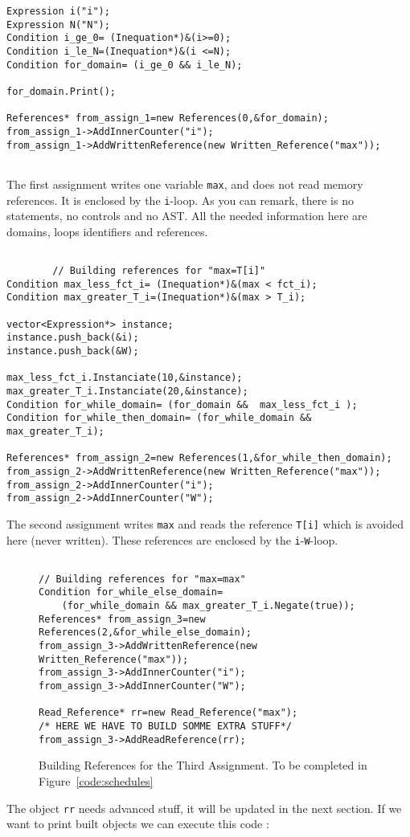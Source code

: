 \begin{lstlisting}[frame=single,framerule=0pt]
Expression i("i");
Expression N("N");
Condition i_ge_0= (Inequation*)&(i>=0);
Condition i_le_N=(Inequation*)&(i <=N);
Condition for_domain= (i_ge_0 && i_le_N);

for_domain.Print();

References* from_assign_1=new References(0,&for_domain);
from_assign_1->AddInnerCounter("i");
from_assign_1->AddWrittenReference(new Written_Reference("max"));


\end{lstlisting}
The first assignment writes one variable \verb|max|, and does not read memory references. It is enclosed by the \verb|i|-loop.
As you can remark, there is no statements, no controls and no AST. All the needed information here  are domains, loops identifiers and references.
\begin{lstlisting}[frame=single,framerule=0pt]

        // Building references for "max=T[i]"
Condition max_less_fct_i= (Inequation*)&(max < fct_i);
Condition max_greater_T_i=(Inequation*)&(max > T_i);

vector<Expression*> instance;
instance.push_back(&i);
instance.push_back(&W);

max_less_fct_i.Instanciate(10,&instance);
max_greater_T_i.Instanciate(20,&instance);
Condition for_while_domain= (for_domain &&  max_less_fct_i );
Condition for_while_then_domain= (for_while_domain && max_greater_T_i);

References* from_assign_2=new References(1,&for_while_then_domain);
from_assign_2->AddWrittenReference(new Written_Reference("max"));
from_assign_2->AddInnerCounter("i");
from_assign_2->AddInnerCounter("W");

\end{lstlisting}
The second assignment writes \verb|max| and reads the reference \verb|T[i]| which is avoided here (never written). These references are enclosed by the \verb|i|-\verb|W|-loop.

\begin{figure}[!h]
\begin{lstlisting}[frame=single,framerule=0pt]

// Building references for "max=max"
Condition for_while_else_domain=
	(for_while_domain && max_greater_T_i.Negate(true));
References* from_assign_3=new References(2,&for_while_else_domain);
from_assign_3->AddWrittenReference(new Written_Reference("max"));
from_assign_3->AddInnerCounter("i");
from_assign_3->AddInnerCounter("W");

Read_Reference* rr=new Read_Reference("max");
/* HERE WE HAVE TO BUILD SOMME EXTRA STUFF*/
from_assign_3->AddReadReference(rr);
\end{lstlisting}
\caption{Building References for the Third Assignment. To be completed in Figure~\ref{code:schedules}}
\label{code:to_be_completed}
\end{figure}
The object \verb|rr| needs advanced stuff, it will be updated in the next section. If we want to print built objects we can execute this code :

